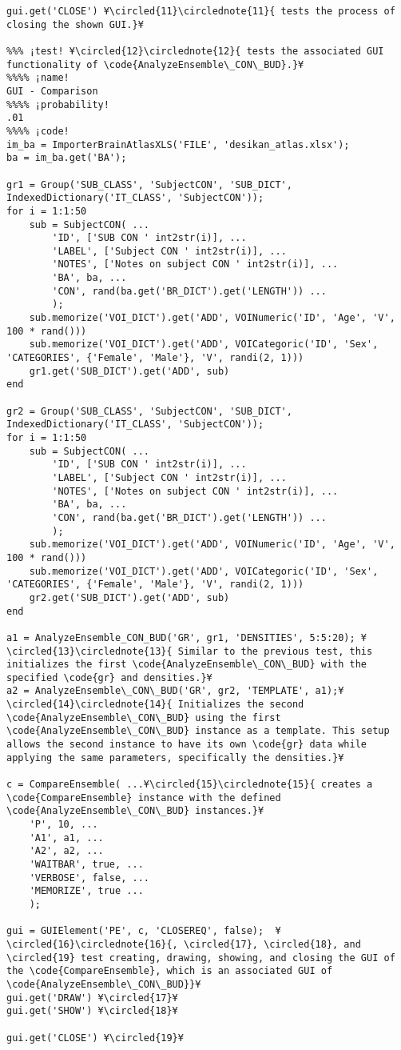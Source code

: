 \documentclass{tufte-handout}
\begin{document}
\begin{lstlisting}
gui.get('CLOSE') ¥\circled{11}\circlednote{11}{ tests the process of closing the shown GUI.}¥

%%% ¡test! ¥\circled{12}\circlednote{12}{ tests the associated GUI functionality of \code{AnalyzeEnsemble\_CON\_BUD}.}¥
%%%% ¡name!
GUI - Comparison
%%%% ¡probability!
.01
%%%% ¡code!
im_ba = ImporterBrainAtlasXLS('FILE', 'desikan_atlas.xlsx');
ba = im_ba.get('BA');

gr1 = Group('SUB_CLASS', 'SubjectCON', 'SUB_DICT', IndexedDictionary('IT_CLASS', 'SubjectCON'));
for i = 1:1:50
    sub = SubjectCON( ...
        'ID', ['SUB CON ' int2str(i)], ...
        'LABEL', ['Subject CON ' int2str(i)], ...
        'NOTES', ['Notes on subject CON ' int2str(i)], ...
        'BA', ba, ...
        'CON', rand(ba.get('BR_DICT').get('LENGTH')) ...
        );
    sub.memorize('VOI_DICT').get('ADD', VOINumeric('ID', 'Age', 'V', 100 * rand()))
    sub.memorize('VOI_DICT').get('ADD', VOICategoric('ID', 'Sex', 'CATEGORIES', {'Female', 'Male'}, 'V', randi(2, 1)))
    gr1.get('SUB_DICT').get('ADD', sub)
end

gr2 = Group('SUB_CLASS', 'SubjectCON', 'SUB_DICT', IndexedDictionary('IT_CLASS', 'SubjectCON'));
for i = 1:1:50
    sub = SubjectCON( ...
        'ID', ['SUB CON ' int2str(i)], ...
        'LABEL', ['Subject CON ' int2str(i)], ...
        'NOTES', ['Notes on subject CON ' int2str(i)], ...
        'BA', ba, ...
        'CON', rand(ba.get('BR_DICT').get('LENGTH')) ...
        );
    sub.memorize('VOI_DICT').get('ADD', VOINumeric('ID', 'Age', 'V', 100 * rand()))
    sub.memorize('VOI_DICT').get('ADD', VOICategoric('ID', 'Sex', 'CATEGORIES', {'Female', 'Male'}, 'V', randi(2, 1)))
    gr2.get('SUB_DICT').get('ADD', sub)
end

a1 = AnalyzeEnsemble_CON_BUD('GR', gr1, 'DENSITIES', 5:5:20); ¥\circled{13}\circlednote{13}{ Similar to the previous test, this initializes the first \code{AnalyzeEnsemble\_CON\_BUD} with the specified \code{gr} and densities.}¥
a2 = AnalyzeEnsemble\_CON\_BUD('GR', gr2, 'TEMPLATE', a1);¥\circled{14}\circlednote{14}{ Initializes the second \code{AnalyzeEnsemble\_CON\_BUD} using the first \code{AnalyzeEnsemble\_CON\_BUD} instance as a template. This setup allows the second instance to have its own \code{gr} data while applying the same parameters, specifically the densities.}¥

c = CompareEnsemble( ...¥\circled{15}\circlednote{15}{ creates a \code{CompareEnsemble} instance with the defined \code{AnalyzeEnsemble\_CON\_BUD} instances.}¥
    'P', 10, ...
    'A1', a1, ...
    'A2', a2, ...
    'WAITBAR', true, ...
    'VERBOSE', false, ...
    'MEMORIZE', true ...
    );

gui = GUIElement('PE', c, 'CLOSEREQ', false);  ¥\circled{16}\circlednote{16}{, \circled{17}, \circled{18}, and \circled{19} test creating, drawing, showing, and closing the GUI of the \code{CompareEnsemble}, which is an associated GUI of \code{AnalyzeEnsemble\_CON\_BUD}}¥
gui.get('DRAW') ¥\circled{17}¥
gui.get('SHOW') ¥\circled{18}¥

gui.get('CLOSE') ¥\circled{19}¥

\end{lstlisting}
\end{document}
